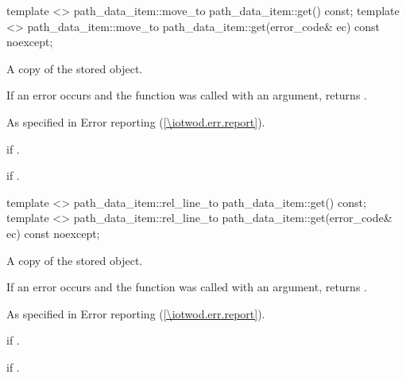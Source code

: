 \begin{itemdecl}
template <>
path_data_item::move_to path_data_item::get() const;
template <>
path_data_item::move_to path_data_item::get(error_code& ec) const noexcept;
\end{itemdecl}
\begin{itemdescr}
\pnum
\returns
A copy of the stored  object.

\pnum
If an error occurs and the function was called with an  argument, returns .

\pnum
\throws
As specified in Error reporting (\ref{\iotwod.err.report}).

\pnum
\errors
{} if .

\pnum
{} if .
\end{itemdescr}

\begin{itemdecl}
template <>
path_data_item::rel_line_to path_data_item::get() const;
template <>
path_data_item::rel_line_to path_data_item::get(error_code& ec) const noexcept;
\end{itemdecl}
\begin{itemdescr}
\pnum
\returns
A copy of the stored  object.

\pnum
If an error occurs and the function was called with an  argument, returns .

\pnum
\throws
As specified in Error reporting (\ref{\iotwod.err.report}).

\pnum
\errors
{} if .

\pnum
{} if .
\end{itemdescr}


